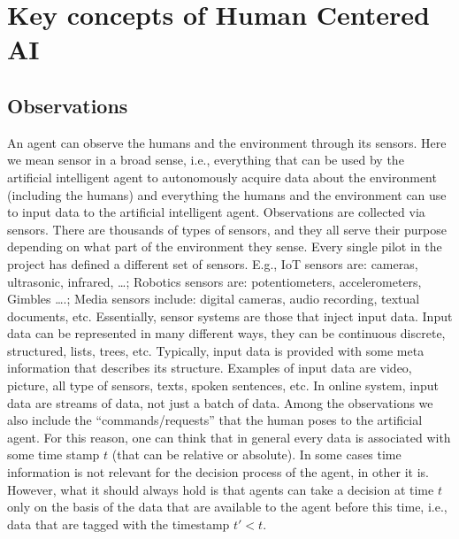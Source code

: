 \section{Key concepts of Human Centered AI } 

\subsection{Observations}





An agent can observe the humans and the environment through its
sensors. Here we mean sensor in a broad sense, i.e., everything that
can be used by the artificial intelligent agent to autonomously
acquire data about the environment (including the humans) and
everything the humans and the environment can use to input data to the
artificial intelligent agent.  Observations are collected via
sensors. There are thousands of types of sensors, and they all serve
their purpose depending on what part of the environment they
sense. Every single pilot in the project has defined a different set
of sensors. E.g., IoT sensors are: cameras, ultrasonic, infrared,
\dots; Robotics sensors are: potentiometers, accelerometers, Gimbles
\dots.; Media sensors include: digital cameras, audio recording,
textual documents, etc.  Essentially, sensor systems are those that
inject input data. Input data can be represented in many different
ways, they can be continuous discrete, structured, lists, trees,
etc. Typically, input data is provided with some meta information that
describes its structure.  Examples of input data are video, picture,
all type of sensors, texts, spoken sentences, etc. In online system,
input data are streams of data, not just a batch of data. Among the
observations we also include the ``commands/requests'' that the human
poses to the artificial agent.  For this reason, one can think that in
general every data is associated with some time stamp $t$ (that can be
relative or absolute). In some cases time information is not relevant
for the decision process of the agent, in other it is. However, what
it should always hold is that agents can take a decision at time $t$
only on the basis of the data that are available to the agent before
this time, i.e., data that are tagged with the timestamp $t'< t$.

